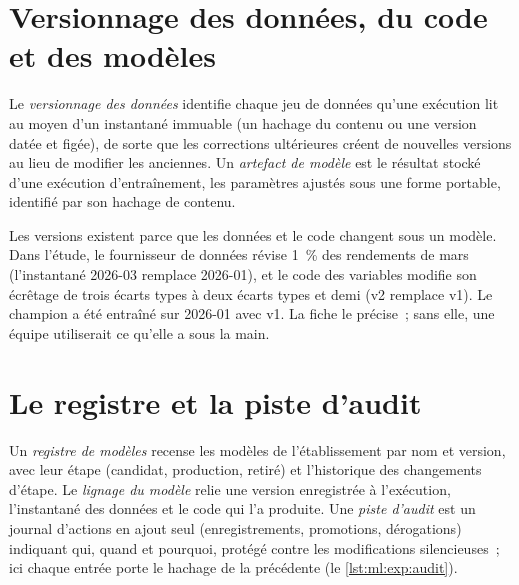 \section{Versionnage des données, du code et des modèles}

\begin{definition}\label{def:ml:experiment-tracking-and-reproducibility:versions}
Le \emph{versionnage des données} identifie chaque jeu de données qu'une exécution lit au moyen d'un instantané immuable (un hachage du contenu ou une
version datée et figée), de sorte que les corrections ultérieures créent de nouvelles versions au lieu de modifier les anciennes. Un \emph{artefact
de modèle} est le résultat stocké d'une exécution d'entraînement, les paramètres ajustés sous une forme portable, identifié par
son hachage de contenu.
\end{definition}

Les versions existent parce que les données et le code changent sous un modèle. Dans l'étude, le fournisseur de données révise 1~\% des rendements de mars
(l'instantané 2026-03 remplace 2026-01), et le code des variables modifie son écrêtage de trois écarts types à deux écarts types et demi
(v2 remplace v1). Le champion a été entraîné sur 2026-01 avec v1. La fiche le précise~; sans elle, une équipe utiliserait ce qu'elle a sous la main.

\section{Le registre et la piste d'audit}

\begin{definition}\label{def:ml:experiment-tracking-and-reproducibility:registry}
Un \emph{registre de modèles} recense les modèles de l'établissement par nom et version, avec leur étape (candidat,
production, retiré) et l'historique des changements d'étape. Le \emph{lignage du modèle} relie une version enregistrée à
l'exécution, l'instantané des données et le code qui l'a produite. Une \emph{piste d'audit} est un journal d'actions
en ajout seul (enregistrements, promotions, dérogations) indiquant qui, quand et pourquoi, protégé contre les modifications silencieuses~; ici chaque entrée porte le hachage
de la précédente (le \cref{lst:ml:exp:audit}).
\end{definition}

